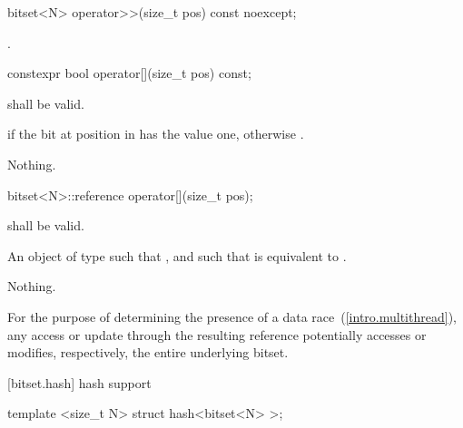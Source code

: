 %
\begin{itemdecl}
bitset<N> operator>>(size_t pos) const noexcept;
\end{itemdecl}

\begin{itemdescr}
\pnum
\returns
{}.
\end{itemdescr}

\begin{itemdecl}
constexpr bool operator[](size_t pos) const;
\end{itemdecl}

\begin{itemdescr}
\pnum
\requires
{} shall be valid.

\pnum
\returns
{} if the bit at position  in  has the value
one, otherwise .

\pnum
\throws Nothing.
\end{itemdescr}

\begin{itemdecl}
bitset<N>::reference operator[](size_t pos);
\end{itemdecl}

\begin{itemdescr}
\pnum
\requires
{} shall be valid.

\pnum
\returns
An object of type
such that
,
and such that
is equivalent to
.

\pnum
\throws Nothing.

\pnum
\remark For the purpose of determining the presence of a data
race~(\ref{intro.multithread}), any access or update through the resulting
reference potentially accesses or modifies, respectively, the entire
underlying bitset.
\end{itemdescr}

[bitset.hash]{ hash support}

%
\begin{itemdecl}
template <size_t N> struct hash<bitset<N> >;
\end{itemdecl}

